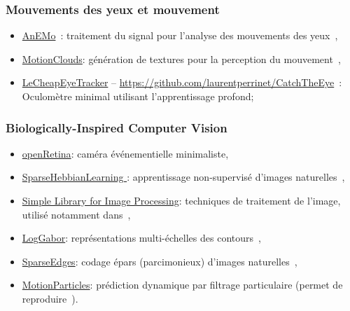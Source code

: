 \documentclass[10pt,french,a4paper,oneside]{article}%
\begin{document}
\subsubsection{Mouvements des yeux et mouvement} %
\begin{itemize}

	\item \href{https://github.com/invibe/AnEMo}{AnEMo}~: traitement du signal pour l'analyse des mouvements des yeux~\citep{Pasturel18anemo},
	\item \href{http://github.com/NeuralEnsemble/MotionClouds}{MotionClouds}: génération de textures pour la perception du mouvement~\citep{Sanz12,Vacher15nips,Vacher16},
	\item \href{https://github.com/laurentperrinet/LeCheapEyeTracker}{LeCheapEyeTracker} -- \url{https://github.com/laurentperrinet/CatchTheEye}~: Oculomètre minimal utilisant l'apprentissage profond;
\end{itemize}



\subsubsection{Biologically-Inspired Computer Vision} %
\begin{itemize}
	\item \href{https://github.com/laurentperrinet/openRetina}{openRetina}: caméra événementielle minimaliste,
	\item \href{http://github.com/bicv/SparseHebbianLearning }{SparseHebbianLearning }: apprentissage non-supervisé d'images naturelles~\citep{Perrinet10shl,Perrinet19hulk},
	\item \href{http://github.com/bicv/SLIP}{Simple Library for Image Processing}: techniques de traitement de l'image, utilisé notamment dans~\citep{Perrinet15bicv,Ravello16droplets,PerrinetBednar15,Perrinet15eusipco,Perrinet16EUVIP},
	\item \href{http://github.com/bicv/LogGabor}{LogGabor}: représentations multi-échelles des contours~\citep{Fischer07,Fischer07cv},
	\item \href{http://github.com/bicv/SparseEdges}{SparseEdges}: codage épars (parcimonieux) d'images naturelles~\citep{Perrinet15bicv,PerrinetBednar15},
	\item \href{https://github.com/laurentperrinet/Khoei_2017_PLoSCB}{MotionParticles}: prédiction dynamique par filtrage particulaire (permet de reproduire~\citep{Perrinet12pred,Khoei13jpp,KhoeiMassonPerrinet17}).
\end{itemize}
\end{document}
